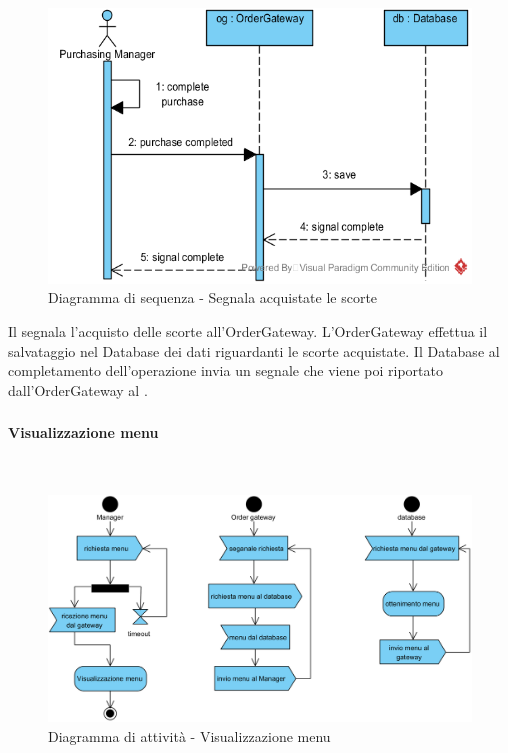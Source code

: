 \begin{figure}[H]
	\centering
	\includegraphics[width=14cm]{../../documenti/SpecificaTecnica/diagrammi_img/sequenza/responsabile_acquisti_segnala_scorte_acquistate.png}
	\caption{Diagramma di sequenza - Segnala acquistate le scorte}
\end{figure}
Il \Purchasingmanager{} segnala l'acquisto delle scorte all'Order\-Gateway. L'Order\-Gateway effettua il salvataggio nel Database dei dati riguardanti le scorte acquistate. Il Database al completamento dell'operazione invia un segnale che viene poi riportato dall'Order\-Gateway al \Purchasingmanager{}.

\subsubsection{\Manager{}}

\paragraph{Visualizzazione menu}\mbox{}\\
\nopagebreak
\begin{figure}[H]
	\centering
	\includegraphics[width=14cm]{diagrammi_img/attivita/manager_get_menu.png}
	\caption{Diagramma di attività - Visualizzazione menu}
\end{figure}


